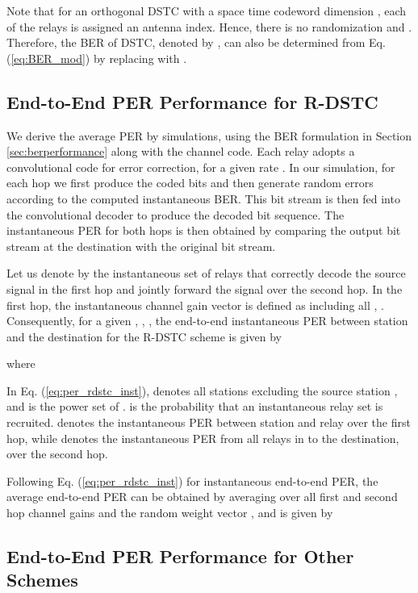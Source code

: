 \documentclass[peerreview,draftcls,onecolumn,12pt,a4paper]{IEEEtran}
\begin{document}
Note that for an orthogonal DSTC with a space time codeword
dimension , each of the  relays is assigned an antenna
index. Hence, there is no randomization and
. Therefore, the BER of DSTC, denoted by
, can also be
determined from Eq. (\ref{eq:BER_mod}) by replacing 
with .

\vspace{-0.15in}
\subsection{End-to-End PER Performance for R-DSTC}\label{sec:perfading}
\vspace{-0.05in}

We derive the average PER by simulations, using the BER
formulation in Section \ref{sec:berperformance} along with the
channel code. Each relay adopts a convolutional code  for
error correction, for a given rate . In our simulation, for
each hop we first produce the coded bits and then generate random
errors according to the computed instantaneous BER. This bit
stream is then fed into the convolutional decoder to produce the
decoded bit sequence. The instantaneous PER for both hops is then
obtained by comparing the output bit stream at the destination
with the original bit stream.

Let us denote by  the instantaneous set of relays
that correctly decode the source signal in the first hop and
jointly forward the signal over the second hop. In the first hop,
the instantaneous channel gain vector is defined as
 including all , . Consequently, for a given , , , the end-to-end
instantaneous PER between station  and the destination for the
R-DSTC scheme is given by


where


In Eq. (\ref{eq:per_rdstc_inst}),  denotes all stations
excluding the source station , and  is the
power set of .  is the probability
that an instantaneous relay set  is recruited.
 denotes the instantaneous PER between
station  and relay  over the first hop, while  denotes the
instantaneous PER from all relays in  to the
destination, over the second hop.

Following Eq. (\ref{eq:per_rdstc_inst}) for instantaneous
end-to-end PER, the average end-to-end PER can be obtained by
averaging over all first and second hop channel gains and the
random weight vector , and is given by


\vspace{-0.15in}
\subsection{End-to-End PER Performance for Other Schemes}\label{sec:end2end}
\vspace{-0.05in}
\end{document}
